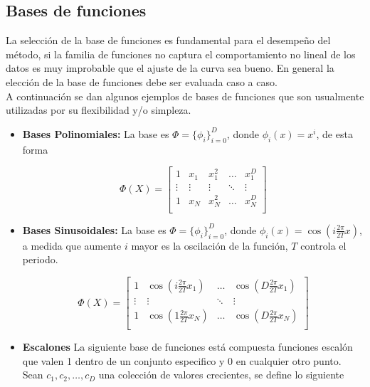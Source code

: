 \subsection{Bases de funciones}

La selección de la base de funciones es fundamental para el desempeño del método, si la familia de funciones no captura el comportamiento no lineal de los datos es muy improbable que el ajuste de la curva sea bueno. En general la elección de la base de funciones debe ser evaluada caso a caso.\\

A continuación se dan algunos ejemplos de bases de funciones que son usualmente utilizadas por su flexibilidad y/o simpleza.

\begin{itemize}
    \item{\textbf{Bases Polinomiales:}}
    La base es $\Phi=\{\phi_i\}_{i=0}^D$, donde $\phi_i(x)=x^i$, de esta forma
    
    \begin{equation}
        \Phi(X) = \left[ \begin{matrix} 1 & x_1 & x_1^2 & \ldots & x_1^D\\
        \vdots & \vdots & \vdots & \ddots & \vdots \\
        1 & x_N & x_N^2 & \ldots & x_N^D\\
        \end{matrix} \right]
    \end{equation}
    
    \item{\textbf{Bases Sinusoidales:}}
    La base es $\Phi=\{\phi_i\}_{i=0}^D$, donde 
    $\phi_i(x)=\cos(i\frac{2\pi}{2T}x)$, a medida que aumente $i$ mayor es la oscilación de la función, $T$ controla el periodo.
    
    \begin{equation}
        \Phi(X) = \left[ \begin{matrix}
        1 & \cos(i\frac{2\pi}{2T}x_1) & \ldots & \cos(D\frac{2\pi}{2T}x_1)\\
        \vdots & \vdots  & \ddots & \vdots \\
        1 & \cos(1\frac{2\pi}{2T}x_N) & \ldots & \cos(D\frac{2\pi}{2T}x_N)\\
        \end{matrix} \right]
    \end{equation}
    
    \item{\textbf{Escalones}}
    La siguiente base de funciones está compuesta funciones escalón que valen 1 dentro de un conjunto especifico y 0 en cualquier otro punto. Sean $c_1,c_2, \ldots,c_D$ una colección de valores crecientes, se define lo siguiente
    

\end{itemize}
